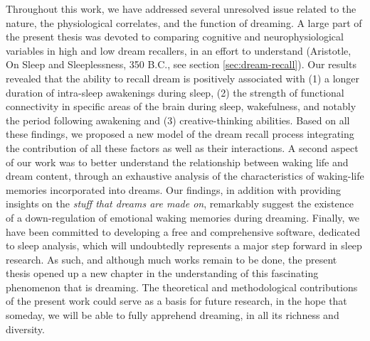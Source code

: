 Throughout this work, we have addressed several unresolved issue related to the nature, the physiological correlates, and the function of dreaming. A large part of the present thesis was devoted to comparing cognitive and neurophysiological variables in high and low dream recallers, in an effort to understand  (Aristotle, On Sleep and Sleeplessness, 350 B.C., see section \ref{sec:dream-recall}). Our results revealed that the ability to recall dream is positively associated with (1) a longer duration of intra-sleep awakenings during sleep, (2) the strength of functional connectivity in specific areas of the brain during sleep, wakefulness, and notably the period following awakening and (3) creative-thinking abilities. Based on all these findings, we proposed a new model of the dream recall process integrating the contribution of all these factors as well as their interactions. A second aspect of our work was to better understand the relationship between waking life and dream content, through an exhaustive analysis of the characteristics of waking-life memories incorporated into dreams. Our findings, in addition with providing insights on the \emph{stuff that dreams are made on}, remarkably suggest the existence of a down-regulation of emotional waking memories during dreaming. Finally, we have been committed to developing a free and comprehensive software, dedicated to sleep analysis, which will undoubtedly represents a major step forward in sleep research. As such, and although much works remain to be done, the present thesis opened up a new chapter in the understanding of this fascinating phenomenon that is dreaming. The theoretical and methodological contributions of the present work could serve as a basis for future research, in the hope that someday, we will be able to fully apprehend dreaming, in all its richness and diversity.
